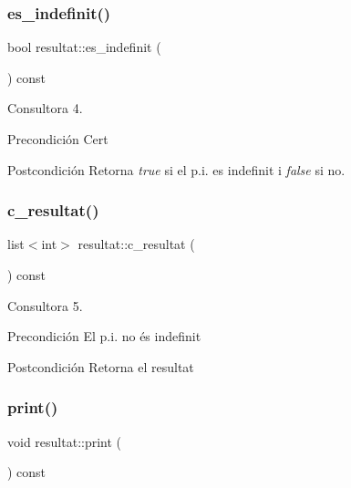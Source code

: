 \subsubsection{\texorpdfstring{es\+\_\+indefinit()}{es\_indefinit()}}
{\footnotesize\ttfamily bool resultat\+::es\+\_\+indefinit (\begin{DoxyParamCaption}{ }\end{DoxyParamCaption}) const}



Consultora 4. 

\begin{DoxyPrecond}{Precondición}
Cert 
\end{DoxyPrecond}
\begin{DoxyPostcond}{Postcondición}
Retorna {\itshape true} si el p.\+i. es indefinit i {\itshape false} si no. 
\end{DoxyPostcond}
\hypertarget{classresultat_ada9590460dcd2d077f48bc3e10ec529e}{}\label{classresultat_ada9590460dcd2d077f48bc3e10ec529e} 
\subsubsection{\texorpdfstring{c\+\_\+resultat()}{c\_resultat()}}
{\footnotesize\ttfamily list$<$int$>$ resultat\+::c\+\_\+resultat (\begin{DoxyParamCaption}{ }\end{DoxyParamCaption}) const}



Consultora 5. 

\begin{DoxyPrecond}{Precondición}
El p.\+i. no és indefinit 
\end{DoxyPrecond}
\begin{DoxyPostcond}{Postcondición}
Retorna el resultat 
\end{DoxyPostcond}
\hypertarget{classresultat_adaa9aa55a0a9891a24f7dc04c4c1ebf2}{}\label{classresultat_adaa9aa55a0a9891a24f7dc04c4c1ebf2} 
\subsubsection{\texorpdfstring{print()}{print()}}
{\footnotesize\ttfamily void resultat\+::print (\begin{DoxyParamCaption}{ }\end{DoxyParamCaption}) const}



